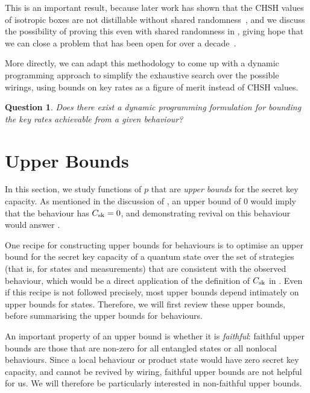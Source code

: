 \documentclass[10pt, a4paper]{article}
\numberwithin{equation}{section} %
\theoremstyle{definition}
\theoremstyle{plain}
\newtheorem{question}{Question}
\newcommand{\?}{\mathrel{?}} %
\newcommand{\sk}{\rm sk}
\begin{document}
      This is an important result, because later work has shown that the CHSH values of isotropic boxes are not distillable without shared randomness~\cite{NLMonotones}, and we discuss the possibility of proving this even with shared randomness in , giving hope that we can close a problem that has been open for over a decade~\cite{NLLimits, DistillationBounds}.

      More directly, we can adapt this methodology to come up with a dynamic programming approach to simplify the exhaustive search over the possible wirings, using bounds on key rates as a figure of merit instead of CHSH values.

      \begin{question}
        Does there exist a dynamic programming formulation for bounding the key rates achievable from a given behaviour?
      \end{question}

      \section{Upper Bounds}\label{sec:ubound}

      In this section, we study functions of \(p\) that are \emph{upper bounds} for the secret key capacity. As mentioned in the discussion of , an upper bound of 0 would imply that the behaviour has \(C_{\sk} = 0\), and demonstrating revival on this behaviour would answer .

      One recipe for constructing upper bounds for behaviours is to optimise an upper bound for the secret key capacity of a quantum state over the set of strategies (that is, for states and measurements) that are consistent with the observed behaviour, which would be a direct application of the definition of \(C_{\sk}\) in . Even if this recipe is not followed precisely, most upper bounds depend intimately on upper bounds for states. Therefore, we will first review these upper bounds, before summarising the upper bounds for behaviours.

      An important property of an upper bound is whether it is \emph{faithful}: faithful upper bounds are those that are non-zero for all entangled states or all nonlocal behaviours. Since a local behaviour or product state would have zero secret key capacity, and cannot be revived by wiring, faithful upper bounds are not helpful for us. We will therefore be particularly interested in non-faithful upper bounds.
\end{document}
